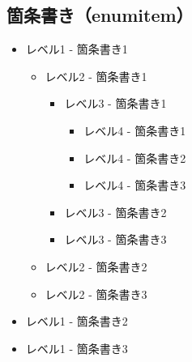 \subsection{箇条書き（enumitem）}

\begin{itemize}[leftmargin=3cm]
    \item レベル1 - 箇条書き1
    \begin{itemize}
        \item レベル2 - 箇条書き1
        \begin{itemize}
            \item レベル3 - 箇条書き1
            \begin{itemize}
                \item レベル4 - 箇条書き1
                \item レベル4 - 箇条書き2
                \item レベル4 - 箇条書き3
            \end{itemize}
            \item レベル3 - 箇条書き2
            \item レベル3 - 箇条書き3
        \end{itemize}
        \item レベル2 - 箇条書き2
        \item レベル2 - 箇条書き3
    \end{itemize}
    \item レベル1 - 箇条書き2
    \item レベル1 - 箇条書き3
\end{itemize}
